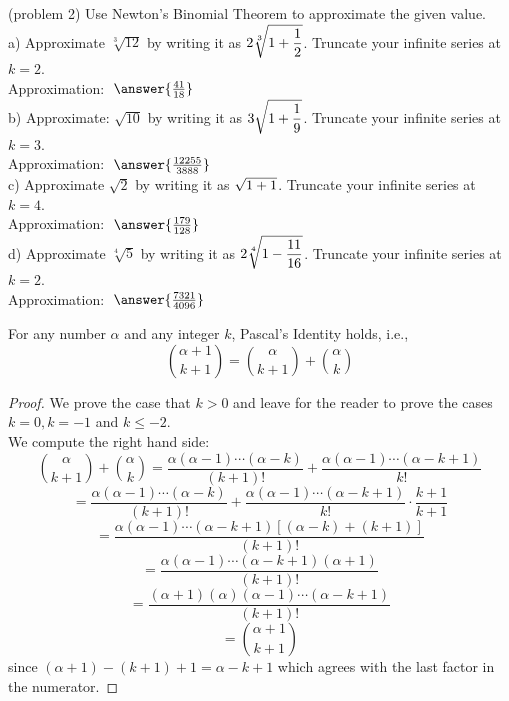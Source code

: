 \documentclass[handout]{ximera}
\begin{document}
\begin{problem}(problem 2) Use Newton's Binomial Theorem to approximate the given value. \\
a) Approximate $\sqrt[3]{12}$ by writing it as $\displaystyle 2 \sqrt[3]{1+\frac12}$. 
Truncate your infinite series at $k = 2$.\\
Approximation: $\; \answer{\frac{41}{18}}\;$  \\

b) Approximate: $\sqrt{10}$ by writing it as $\displaystyle 3 \sqrt{1+\frac19}$.  
Truncate your infinite series at $k = 3$. \\ 
Approximation: $\; \answer{\frac{12255}{3888}}\;$ \\

c) Approximate $\sqrt{2}$ by writing it as $\displaystyle  \sqrt{1+1}$.  Truncate your infinite series at $k = 4$. \\ 
Approximation: $\; \answer{\frac{179}{128}}$ \\


d) Approximate $\sqrt[4]{5}$ by writing it as $\displaystyle 2 \sqrt[4]{1-\frac{11}{16}}$.  Truncate your infinite series at $k = 2$. \\ 
Approximation: $\; \answer{\frac{7321}{4096}}\;$ \\

\end{problem}

\begin{proposition}
For any number $\alpha$ and any integer $k$, Pascal's Identity holds, i.e.,
\[
\binom{\alpha +1}{k+1} = \binom{\alpha}{k+1}+\binom{\alpha}{k}
\]
\end{proposition}

\begin{proof}
We prove the case that $k > 0$ and leave for the reader to prove the cases $k=0, k = -1$ and $k \leq -2$.\\
We compute the right hand side:
\[
\binom{\alpha}{k+1}+\binom{\alpha}{k} = \frac{\alpha (\alpha - 1) \cdots (\alpha -k)}{(k+1)!} + 
\frac{\alpha (\alpha - 1) \cdots (\alpha -k+1)}{k!}
\]
\[
= \frac{\alpha (\alpha - 1) \cdots (\alpha -k)}{(k+1)!} + \frac{\alpha (\alpha - 1) \cdots (\alpha -k+1)}{k!} \cdot \frac{k+1}{k+1}
\]
\[
= \frac{\alpha (\alpha - 1) \cdots (\alpha -k + 1)[(\alpha -k) + (k+1)]}{(k+1)!}
\]
\[
= \frac{\alpha (\alpha - 1) \cdots (\alpha -k + 1)(\alpha +1)}{(k+1)!}
\]
\[
= \frac{(\alpha +1)(\alpha) (\alpha - 1) \cdots (\alpha -k + 1)}{(k+1)!}
\]
\[
=\binom{\alpha+1}{k+1}
\]
since $(\alpha + 1) - (k+1) +1 = \alpha -k +1$ which agrees with the last factor in the numerator.
\end{proof}
\end{document}
